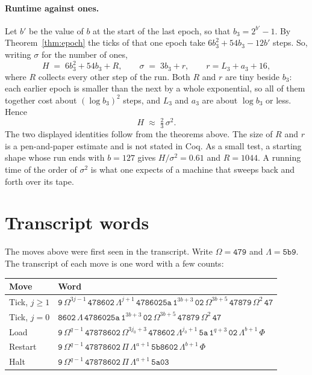 \documentclass[11pt]{article}
\theoremstyle{remark}
\newcommand{\w}[1]{\mathtt{#1}}
\begin{document}
\paragraph{Runtime against ones.} Let $b'$ be the value of $b$ at the start of
the last epoch, so that $b_3 = 2^{b'}-1$. By Theorem~\ref{thm:epoch} the ticks
of that one epoch take $6b_3^{2}+54b_3-12b'$ steps. So, writing $\sigma$ for the
number of ones,
\[
H \;=\; 6b_3^{2} + 54b_3 + R, \qquad \sigma \;=\; 3b_3 + r, \qquad r = L_3+a_3+16,
\]
where $R$ collects every other step of the run. Both $R$ and $r$ are tiny
beside $b_3$: each earlier epoch is smaller than the next by a whole
exponential, so all of them together cost about $(\log b_3)^{2}$ steps, and
$L_3$ and $a_3$ are about $\log b_3$ or less. Hence
\[
H \;\approx\; \tfrac{2}{3}\,\sigma^{2} .
\]
The two displayed identities follow from the theorems above. The size of $R$
and $r$ is a pen-and-paper estimate and is not stated in Coq. As a small test,
a starting shape whose run ends with $b=127$ gives $H/\sigma^{2}=0.61$ and
$R = 1044$. A running time of the order of $\sigma^{2}$ is what one expects of
a machine that sweeps back and forth over its tape.

\section{Transcript words}\label{sec:words}

The moves above were first seen in the transcript. Write $\Omega=\w{479}$ and
$\Lambda=\w{5b9}$. The transcript of each move is one word with a few counts:

\begin{center}
\renewcommand{\arraystretch}{1.25}
\begin{tabular}{@{}l>{\raggedright\arraybackslash}p{}@{}}
\toprule
Move & Word\\
\midrule
Tick, $j\ge1$ &
$\w9\,\Omega^{3j-1}\,\w{478602}\,\Lambda^{j+1}\,\w{4786025a}\,\w1^{3b+3}\,\w{02}\,\Omega^{3b+5}\,\w{47879}\,\Omega^{2}\,\w{47}$\\
Tick, $j=0$ &
$\w{8602}\,\Lambda\,\w{4786025a}\,\w1^{3b+3}\,\w{02}\,\Omega^{3b+5}\,\w{47879}\,\Omega^{2}\,\w{47}$\\
Load &
$\w9\,\Omega^{q-1}\,\w{47878602}\,\Omega^{3j_0+3}\,\w{478602}\,\Lambda^{j_0+1}\,\w{5a}\,\w1^{q+3}\,\w{02}\,\Lambda^{b+1}\,\Phi$\\
Restart &
$\w9\,\Omega^{q-1}\,\w{47878602}\,\Pi\,\Lambda^{a+1}\,\w{5b8602}\,\Lambda^{b+1}\,\Phi$\\
Halt &
$\w9\,\Omega^{q-1}\,\w{47878602}\,\Pi\,\Lambda^{a+1}\,\w{5a03}$\\
\bottomrule
\end{tabular}
\end{center}
\end{document}
